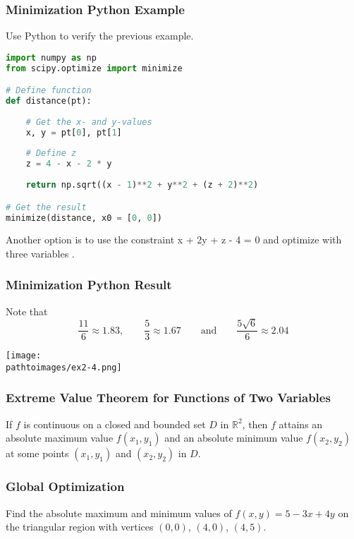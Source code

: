 \documentclass{beamer}
\newcommand{\pathtoimages}{/Users/charlesrambo/Desktop/Bootcamp24/Images}
\begin{document}
\begin{frame}[fragile]
\frametitle{Minimization Python Example}
\small

\begin{Example}
Use Python to verify the previous example.
\end{Example}

\begin{lstlisting}[language=Python]
import numpy as np
from scipy.optimize import minimize

# Define function
def distance(pt):
    
    # Get the x- and y-values
    x, y = pt[0], pt[1]
    
    # Define z 
    z = 4 - x - 2 * y
    
    return np.sqrt((x - 1)**2 + y**2 + (z + 2)**2)

# Get the result   
minimize(distance, x0 = [0, 0]) 
\end{lstlisting}
Another option is to use the constraint x + 2y + z - 4 = 0 and optimize with three variables .
\end{frame}

\begin{frame}
\frametitle{Minimization Python Result}
Note that
$$
\frac{11}{6} \approx 1.83,\qquad \frac{5}{3} \approx 1.67\qquad\text{and}\qquad \frac{5\sqrt{6}}{6}\approx 2.04
$$
\begin{center}
\texttt{[image: \\pathtoimages/ex2-4.png]}
\end{center}
\end{frame}

\begin{frame}
\frametitle{Extreme Value Theorem for Functions of Two Variables}
\begin{Theorem}
If $f$ is continuous on a closed and bounded set $D$ in $\mathbb{R}^2$, then $f$ attains an absolute maximum value $f(x_1, y_1)$ and an absolute minimum value $f(x_2, y_2)$ at some points $(x_1, y_1)$ and $(x_2, y_2)$ in $D$.
\end{Theorem}
\end{frame}

\begin{frame}[t]
\frametitle{Global Optimization}
\begin{Example}
Find the absolute maximum and minimum values of $f(x, y) = 5 - 3x + 4y$ on the triangular region with vertices $(0, 0)$, $(4, 0)$, $(4, 5)$.
\end{Example}
\end{frame}
\end{document}
